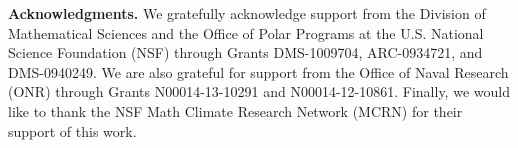 \documentclass{cmslatex}
\begin{document}
\medskip

{\bf Acknowledgments.}
We gratefully acknowledge support from the Division of Mathematical
Sciences and the Office of Polar Programs at the U.S. 
National Science Foundation (NSF) through Grants
DMS-1009704, ARC-0934721, and DMS-0940249. We are also grateful for 
support from the Office of Naval Research (ONR) through
Grants N00014-13-10291 and N00014-12-10861. Finally, we would like to 
thank the NSF Math Climate Research Network (MCRN) for their support
of this work. 


\medskip



\end{document}
